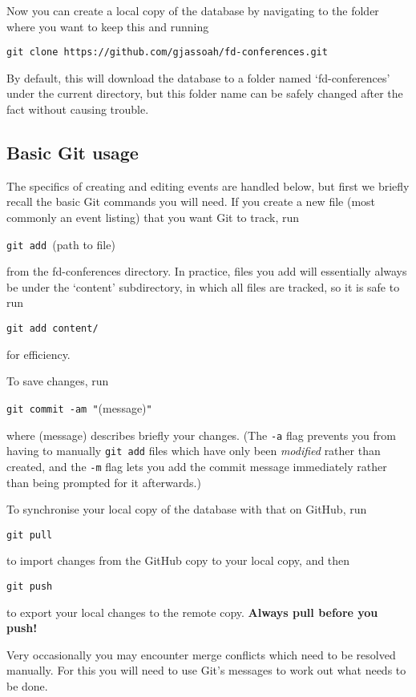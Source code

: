 \documentclass[12pt]{scrartcl}
\theoremstyle{definition}
\begin{document}
Now you can create a local copy of the database by navigating to the folder where you want to keep this and running
\begin{center}
\verb|git clone https://github.com/gjassoah/fd-conferences.git|
\end{center}
By default, this will download the database to a folder named `fd-conferences' under the current directory, but this folder name can be safely changed after the fact without causing trouble.

\subsection{Basic Git usage}
\label{s:basic_Git}
The specifics of creating and editing events are handled below, but first we briefly recall the basic Git commands you will need.
If you create a new file (most commonly an event listing) that you want Git to track, run
\begin{center}
\noindent\verb|git add |(path to file)
\end{center}
from the fd-conferences directory.
In practice, files you add will essentially always be under the `content' subdirectory, in which all files are tracked, so it is safe to run
\begin{center}
\verb|git add content/|
\end{center}
for efficiency.

To save changes, run
\begin{center}
\verb|git commit -am "|(message)\verb|"|
\end{center}
where (message) describes briefly your changes.
(The \verb|-a| flag prevents you from having to manually \verb|git add| files which have only been \emph{modified} rather than created, and the \verb|-m| flag lets you add the commit message immediately rather than being prompted for it afterwards.)

To synchronise your local copy of the database with that on GitHub, run
\begin{center}
\verb|git pull|
\end{center}
to import changes from the GitHub copy to your local copy, and then
\begin{center}
\verb|git push|
\end{center}
to export your local changes to the remote copy.
\textbf{Always pull before you push!}

Very occasionally you may encounter merge conflicts which need to be resolved manually.
For this you will need to use Git's messages to work out what needs to be done.
\end{document}

